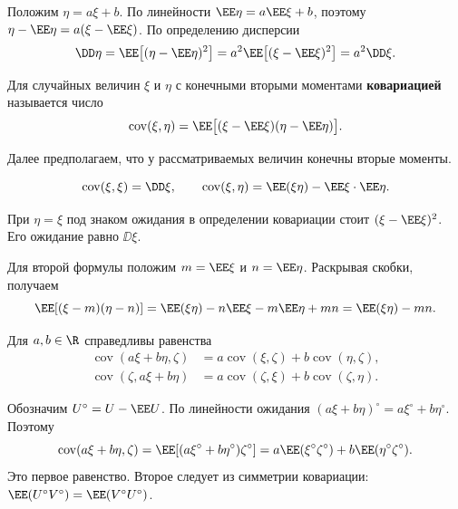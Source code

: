 \begin{Proof}
Положим $\eta=a\xi+b$. По линейности $\EE\eta=a\EE\xi+b$,
поэтому $\eta-\EE\eta=a(\xi-\EE\xi)$. По определению дисперсии
\[
  \DD\eta=\EE\bigl[(\eta-\EE\eta)^2\bigr]
  =a^2\EE\bigl[(\xi-\EE\xi)^2\bigr]=a^2\DD\xi.
\]
\end{Proof}

\begin{definition}
    Для случайных величин $\xi$ и $\eta$ с конечными вторыми моментами
    \textbf{ковариацией} называется число
    \[
        \operatorname{cov}(\xi,\eta)
        =\EE\bigl[(\xi-\EE\xi)(\eta-\EE\eta)\bigr].
    \]
\end{definition}

Далее предполагаем, что у рассматриваемых величин конечны вторые моменты.

\begin{theorem}
\[
 \operatorname{cov}(\xi,\xi)=\DD\xi,\qquad
 \operatorname{cov}(\xi,\eta)=\EE(\xi\eta)-\EE\xi\cdot\EE\eta.
\]
\end{theorem}
\begin{Proof}
При $\eta=\xi$ под знаком ожидания в определении ковариации стоит
$(\xi-\EE\xi)^2$. Его ожидание равно $\DD\xi$.

\smallskip
Для второй формулы положим $m=\EE\xi$ и $n=\EE\eta$. Раскрывая скобки, получаем
\[
 \EE[(\xi-m)(\eta-n)]
 =\EE(\xi\eta)-n\EE\xi-m\EE\eta+mn=\EE(\xi\eta)-mn.
\]
\end{Proof}

\begin{theorem}
Для $a,b\in\R$ справедливы равенства
\[
 \begin{aligned}
 \operatorname{cov}(a\xi+b\eta,\zeta)
 &=a\operatorname{cov}(\xi,\zeta)+b\operatorname{cov}(\eta,\zeta),\\
 \operatorname{cov}(\zeta,a\xi+b\eta)
 &=a\operatorname{cov}(\zeta,\xi)+b\operatorname{cov}(\zeta,\eta).
 \end{aligned}
\]
\end{theorem}
\begin{Proof}
Обозначим $U^\circ=U-\EE U$. По линейности ожидания
$(a\xi+b\eta)^\circ=a\xi^\circ+b\eta^\circ$. Поэтому
\[
 \operatorname{cov}(a\xi+b\eta,\zeta)
 =\EE[(a\xi^\circ+b\eta^\circ)\zeta^\circ]
 =a\EE(\xi^\circ\zeta^\circ)+b\EE(\eta^\circ\zeta^\circ).
\]
Это первое равенство. Второе следует из симметрии ковариации:
$\EE(U^\circ V^\circ)=\EE(V^\circ U^\circ)$.
\end{Proof}

